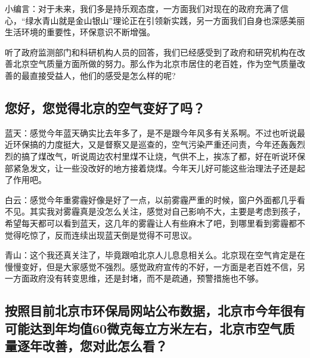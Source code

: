 \documentclass[
]{book}
\begin{document}
小编言：对于未来，我们多是持乐观态度，一方面我们对现在的政府充满了信心，``绿水青山就是金山银山''理论正在引领新实践，另一方面我们自身也深感美丽生活环境的重要性，环保意识不断增强。

听了政府监测部门和科研机构人员的回答，我们已经感受到了政府和研究机构在改善北京空气质量方面所做的努力。那么作为北京市居住的老百姓，作为空气质量改善的最直接受益人，他们的感受是怎么样的呢?

\hypertarget{ux60a8ux597dux60a8ux89c9ux5f97ux5317ux4eacux7684ux7a7aux6c14ux53d8ux597dux4e86ux5417}{%
\subsection{您好，您觉得北京的空气变好了吗？}\label{ux60a8ux597dux60a8ux89c9ux5f97ux5317ux4eacux7684ux7a7aux6c14ux53d8ux597dux4e86ux5417}}

蓝天：感觉今年蓝天确实比去年多了，是不是跟今年风多有关系啊。不过也听说最近环保搞的力度挺大，又是督察又是巡查的，空气污染严重还问责，今年还轰轰烈烈的搞了煤改气，听说周边农村里煤不让烧，气供不上，挨冻了都，好在听说环保部紧急发文，让一些没改好的地方接着烧煤。今年天儿好可能这些治理法子还是起了作用吧。

白云：感觉今年重雾霾好像是好了一点，以前雾霾严重的时候，窗户外面都几乎看不见。其实我对雾霾真是没怎么关注，感觉对自己影响不大，主要是考虑到孩子，希望每天都可以看到蓝天，这几年的雾霾让人有些麻木了吧，到哪里看到雾霾都不觉得吃惊了，反而连续出现蓝天倒是觉得不可思议。

青山：这个我还真关注了，毕竟跟咱北京人儿息息相关么。北京现在空气肯定是在慢慢变好，但是大家感觉不强烈。感觉政府宣传的不好，一方面是老百姓不信，另一方面政府没有转变思维，还是封堵，而不是疏通，预警措施也不够。

\hypertarget{ux6309ux7167ux76eeux524dux5317ux4eacux5e02ux73afux4fddux5c40ux7f51ux7ad9ux516cux5e03ux6570ux636eux5317ux4eacux5e02ux4ecaux5e74ux5f88ux6709ux53efux80fdux8fbeux5230ux5e74ux5747ux503c60ux5faeux514bux6bcfux7acbux65b9ux7c73ux5de6ux53f3ux5317ux4eacux5e02ux7a7aux6c14ux8d28ux91cfux9010ux5e74ux6539ux5584ux60a8ux5bf9ux6b64ux600eux4e48ux770b}{%
\subsection{按照目前北京市环保局网站公布数据，北京市今年很有可能达到年均值60微克每立方米左右，北京市空气质量逐年改善，您对此怎么看？}\label{ux6309ux7167ux76eeux524dux5317ux4eacux5e02ux73afux4fddux5c40ux7f51ux7ad9ux516cux5e03ux6570ux636eux5317ux4eacux5e02ux4ecaux5e74ux5f88ux6709ux53efux80fdux8fbeux5230ux5e74ux5747ux503c60ux5faeux514bux6bcfux7acbux65b9ux7c73ux5de6ux53f3ux5317ux4eacux5e02ux7a7aux6c14ux8d28ux91cfux9010ux5e74ux6539ux5584ux60a8ux5bf9ux6b64ux600eux4e48ux770b}}
\end{document}
